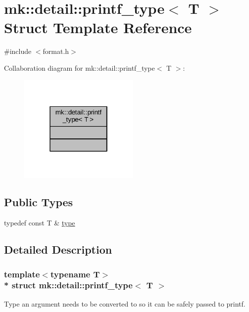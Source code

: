 \hypertarget{structmk_1_1detail_1_1printf__type}{}\section{mk\+:\+:detail\+:\+:printf\+\_\+type$<$ T $>$ Struct Template Reference}
\label{structmk_1_1detail_1_1printf__type}


{\ttfamily \#include $<$format.\+h$>$}



Collaboration diagram for mk\+:\+:detail\+:\+:printf\+\_\+type$<$ T $>$\+:
\nopagebreak
\begin{figure}[H]
\begin{center}
\leavevmode
\includegraphics[width=166pt]{structmk_1_1detail_1_1printf__type__coll__graph}
\end{center}
\end{figure}
\subsection*{Public Types}
\begin{DoxyCompactItemize}
\item 
typedef const T \& \hyperlink{structmk_1_1detail_1_1printf__type_aa318c0f9208836fb7b1af945ec475ae9}{type}
\end{DoxyCompactItemize}


\subsection{Detailed Description}
\subsubsection*{template$<$typename T$>$\\*
struct mk\+::detail\+::printf\+\_\+type$<$ T $>$}

Type an argument needs to be converted to so it can be safely passed to printf.


